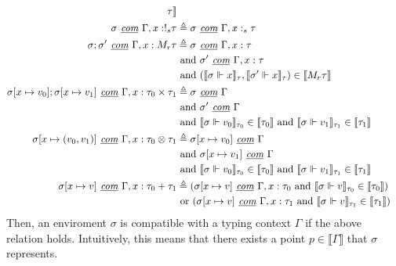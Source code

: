 \begin{definition}
\begin{equation}
\begin{normalsize}
\begin{aligned}[c]
        \tau \rrbracket \\
      \sigma \textit{ \underline{com} } \Gamma, x: !_s \tau &\triangleq
      \sigma \textit{ \underline{com} } \Gamma, x :_s \tau \\
      \sigma; \sigma' \textit{ \underline{com} } \Gamma, x: M_r \tau &\triangleq 
      \sigma \textit{ \underline{com} } \Gamma, x : \tau \\
      & \text{ and } \sigma' \textit{ \underline{com} } \Gamma, x : \tau \\
      & \text{ and } (\llbracket \sigma \Vdash x \rrbracket_{\tau}, \llbracket
      \sigma' \Vdash x \rrbracket_{\tau}) \in \llbracket M_r \tau \rrbracket \\
      \sigma[x \mapsto v_0];\sigma[x \mapsto v_1] \textit{ \underline{com} }
      \Gamma, x : \tau_0 \times \tau_1 &\triangleq 
      \sigma \textit{ \underline{com} } \Gamma \\ 
      & \text{ and } \sigma' \textit{ \underline{com} } \Gamma \\
      & \text{ and } \llbracket \sigma \Vdash v_0 \rrbracket_{\tau_0} \in
          \llbracket \tau_0 \rrbracket
        \text{ and } \llbracket \sigma \Vdash v_1 \rrbracket_{\tau_1} \in
          \llbracket \tau_1 \rrbracket \\
      \sigma[x \mapsto (v_0, v_1)] \textit{ \underline{com} } \Gamma, x : \tau_0
      \otimes \tau_1 &\triangleq
      \sigma[x \mapsto v_0] \textit{ \underline{com} } \Gamma \\
      & \text{ and } \sigma[x \mapsto v_1] \textit{ \underline{com} } \Gamma \\
      & \text{ and } \llbracket \sigma \Vdash v_0 \rrbracket_{\tau_0} \in
          \llbracket \tau_0 \rrbracket
        \text{ and } \llbracket \sigma \Vdash v_1 \rrbracket_{\tau_1} \in
          \llbracket \tau_1 \rrbracket \\
      \sigma[x \mapsto v] \textit{ \underline{com} } \Gamma, x : \tau_0 + \tau_1
      &\triangleq
      (\sigma[x \mapsto v] \textit{ \underline{com} } \Gamma, x : \tau_0 
        \text{ and } \llbracket \sigma \Vdash v \rrbracket_{\tau_0} \in
          \llbracket \tau_0 \rrbracket) \\
      & \text{ or } (\sigma[x \mapsto v] \textit{ \underline{com} } \Gamma, x :
      \tau_1 
        \text{ and } \llbracket \sigma \Vdash v \rrbracket_{\tau_1} \in
          \llbracket \tau_1 \rrbracket) \\
    \end{aligned}
    \end{normalsize}
  \end{equation}
  Then, an enviroment $\sigma$ is compatible with a typing context $\Gamma$ if
  the above relation holds. Intuitively, this means that there exists a point $p
  \in \llbracket \Gamma \rrbracket$ that $\sigma$ represents.
\end{definition}



